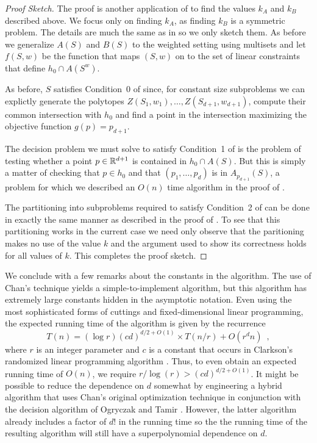 \documentclass[lotsofwhite]{patmorin}
\begin{document}
\begin{proof}[Proof Sketch]
The proof is another application of  to find the values
$k_A$ and $k_B$ described above.  We focus only on finding $k_A$, as
finding $k_B$ is a symmetric problem.  The details are much the same
as in  so we only sketch them.  As before we
generalize $A(S)$ and $B(S)$ to the weighted setting using multisets
and let $f(S,w)$ be the function that maps $(S,w)$ on to the set of
linear constraints that define $h_0\cap A(S^w)$.

As before, $S$ satisfies Condition~0 of  since, for
constant size subproblems we can explictly generate the polytopes
$Z(S_1,w_1),\ldots,Z(S_{d+1},w_{d+1})$, compute their common
intersection with $h_0$ and find a point in the intersection
maximizing the objective function $g(p)=p_{d+1}$. 

The decision problem we must solve to satisfy Condition~1 of
 is the problem of testing whether a point $p\in
\mathbb{R}^{d+1}$ is contained in $h_0\cap A(S)$.  But this is simply a matter
of checking that $p\in h_0$ and that $(p_1,\ldots,p_d)$ is in
$A_{p_{d+1}}(S)$, a problem for which we described an $O(n)$ time
algorithm in the proof of .

The partitioning into subproblems required to satisfy Condition~2 of
 can be done in exactly the same manner as described in
the proof of .  To see that this partitioning works
in the current case we need only observe that the paritioning makes no
use of the value $k$ and the argument used to show its correctness
holds for all values of $k$.  This completes the proof sketch.
\end{proof}

We conclude with a few remarks about the constants in the algorithm.
The use of Chan's technique yields a simple-to-implement algorithm,
but this algorithm has extremely large constants hidden in the
asymptotic notation.  Even using the most
sophisticated forms of cuttings and fixed-dimensional linear
programming, the expected running time of the algorithm is given by
the recurrence
\[
	T(n) = (\log r)(cd)^{d/2+O(1)}\times T(n/r) + O(r^d n) \enspace ,
\]
where $r$ is an integer parameter and $c$ is a constant that occurs in
Clarkson's randomized linear programming algorithm \cite{c95}.  Thus,
to even obtain an expected running time of $O(n)$, we require
$r/\log(r) > (cd)^{d/2+O(1)}$.  It might be possible to reduce the
dependence on $d$ somewhat by engineering a hybrid algorithm that uses
Chan's original optimization technique \cite{c99} in conjunction with
the decision algorithm of Ogryczak and Tamir \cite{ot03}.  However,
the latter algorithm already includes a factor of $d!$ in the running
time so the the running time of the resulting algorithm will still have 
a superpolynomial dependence on $d$.



\end{document}
